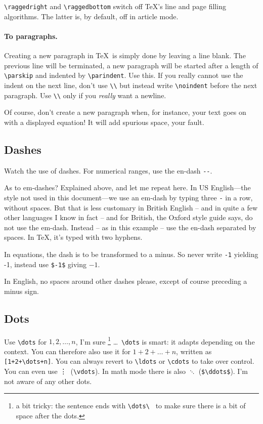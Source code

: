 \documentclass{article}
\begin{document}
\verb+\raggedright+ and \verb+\raggedbottom+ switch off \TeX's line and page filling algorithms. The latter is, by default, off in article mode.


\paragraph{To paragraphs.}
Creating a new paragraph in \TeX\ is simply done by leaving a line blank. The previous line will be terminated, a new paragraph will be started after a  length of \verb+\parskip+ and indented by \verb+\parindent+.  Use this.  If you really cannot use the indent on the next line, don't use \verb+\\+ but instead write  \verb+\noindent+ before the next paragraph.  Use \verb+\\+ only if you \textsl{really} want a newline.

Of course, don't create a new paragraph when, for instance, your text goes on with a displayed equation!  It will add spurious space, your fault.


\subsection{Dashes}\label{sec:dash}
Watch the use of dashes.  For numerical ranges, use the en-dash \verb+--+.

As to em-dashes?  Explained above, and let me repeat here.
In US English---the style not used in this document---we use an em-dash by typing three \verb+-+ in a row, without spaces.
But that is less customary in British English -- and in quite a few other languages I know in fact -- and for British, the Oxford style guide says, do not use the em-dash. Instead -- as in this example -- use the en-dash separated by spaces.  In \TeX, it's typed with two hyphens.

In equations, the dash is to be transformed to a minus.  So never write \verb+-1+ yielding -1, instead use \verb+$-1$+ giving $-1$.

In English, no spaces around other dashes please, except of course preceding a minus sign.

\subsection{Dots}
Use \verb+\dots+ for $1,2,\dots,n$, I'm sure%
\footnote{a bit tricky: the sentence ends with \protect\verb+\dots\ + to make sure
there is a bit of space after the dots.}%
\dots\ \verb+\dots+ is smart: it adapts depending on the context.  You can therefore also use it for $1+2+\dots+n$, written as \verb-[1+2+\dots+n]-. You can always revert to \verb+\ldots+ or \verb+\cdots+ to take over control.  You can even use \vdots\ (\verb+\vdots+).  In math mode there is also $\ddots$ (\verb+$\ddots$+).  I'm not aware of any other dots.
\end{document}
